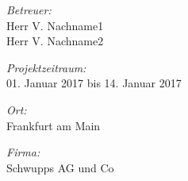 \begin{titlepage}
\begin{center}
\begin{minipage}{0.5\textwidth}
\begin{flushleft} \large
\emph{Betreuer:}\\
Herr V. Nachname1\\Herr V. Nachname2
\end{flushleft}
\end{minipage}
\par\bigskip
\par\bigskip
\begin{minipage}{0.5\textwidth}
\begin{flushleft} \large
\emph{Projektzeitraum:}\\
01. Januar 2017 bis 14. Januar 2017
\end{flushleft}
\end{minipage}
\par\bigskip
\par\bigskip
\begin{minipage}{0.5\textwidth}
\begin{flushleft} \large
\emph{Ort:}\\
Frankfurt am Main
\end{flushleft}
\end{minipage}
\par\bigskip
\par\bigskip
\begin{minipage}{0.5\textwidth}
\begin{flushleft} \large
\emph{Firma:}\\
Schwupps AG und Co
\end{flushleft}
\end{minipage}
\end{center}

\end{titlepage}
